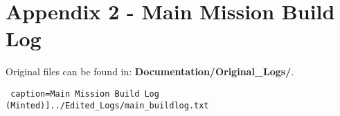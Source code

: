\documentclass[12pt]{article}
\begin{document}
\section*{Appendix 2 - Main Mission Build Log}

Original files can be found in: \textbf{Documentation/Original\_Logs/}.

\texttt{ caption=Main Mission Build Log (Minted)]{../Edited_Logs/main_buildlog.txt}}
\end{document}
